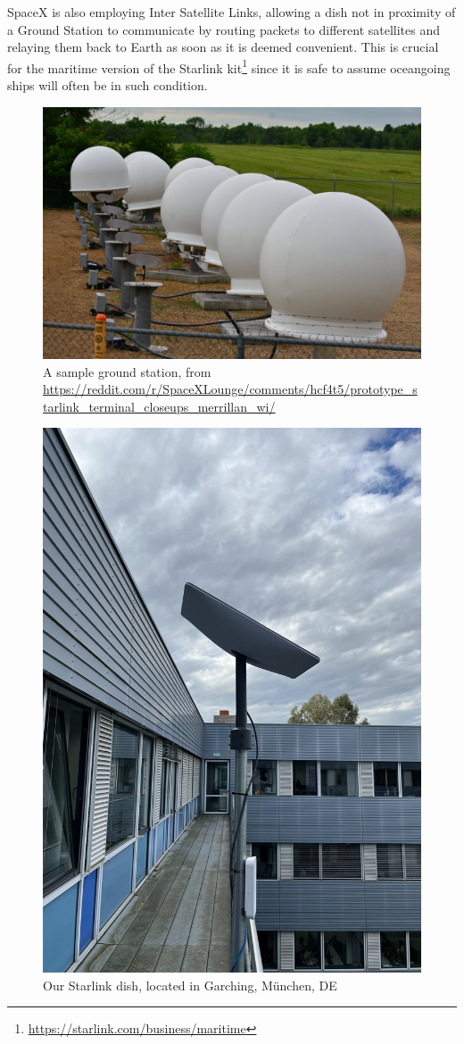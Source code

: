 \documentclass[]{report}
\begin{document}
SpaceX is also employing Inter Satellite Links, allowing a dish not in proximity of a Ground Station to communicate by
routing packets to different satellites and relaying them back to Earth as soon as it is deemed convenient. This is
crucial for the maritime version of the Starlink kit\footnote{\url{https://starlink.com/business/maritime}} since it is
safe to assume oceangoing ships will often be in such condition.
   
\begin{figure}
    \centering
    \includegraphics[width=0.6\columnwidth]{img/ground-station.jpeg}
    \caption{A sample ground station, from \small\protect\url{https://reddit.com/r/SpaceXLounge/comments/hcf4t5/prototype_starlink_terminal_closeups_merrillan_wi/}}
    \label{fig:gs}
\end{figure}
    
\begin{figure}
    \centering
    \includegraphics[width=0.6\columnwidth]{img/dish.jpeg}
    \caption{Our Starlink dish, located in Garching, München, DE}
    \label{fig:dish}
\end{figure}
    
\end{document}
